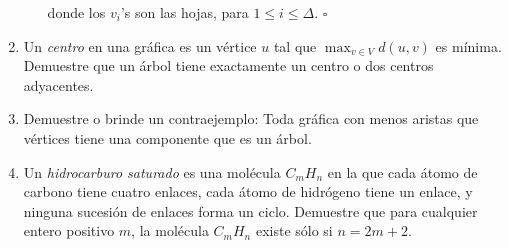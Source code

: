 \documentclass{article}
\begin{document}
\begin{enumerate}
\begin{enumerate}
\begin{figure}[ht!]
        \end{figure}

        donde los $v_i$'s son las hojas, para $1 \leq i \leq \Delta$.
        \hfill $\square$
        \end{enumerate}

    \item Un {\em centro} en una gr\'afica es un v\'ertice
      $u$ tal que $\max_{v \in V} d(u, v)$ es m\'inima.
      Demuestre que un \'arbol tiene exactamente un centro
      o dos centros adyacentes.

    \item Demuestre o brinde un contraejemplo: Toda
      gr\'afica con menos aristas que v\'ertices tiene
      una componente que es un \'arbol.

    \item Un {\em hidrocarburo saturado} es una
      mol\'ecula $C_mH_n$ en la que cada \'atomo de
      carbono tiene cuatro enlaces, cada
      \'atomo de hidr\'ogeno tiene un enlace, y
      ninguna sucesi\'on de enlaces forma un ciclo.
      Demuestre que para cualquier entero positivo
      $m$, la mol\'ecula $C_mH_n$ existe s\'olo si
      $n = 2m + 2$.


\end{enumerate}
\end{document}
